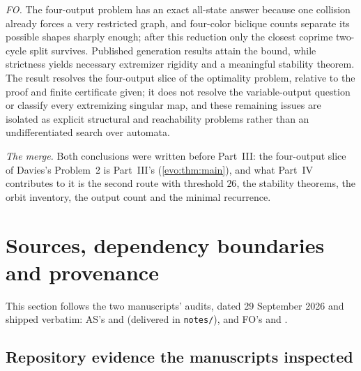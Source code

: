 \documentclass[11pt,a4paper]{article}
\numberwithin{equation}{section}
\theoremstyle{definition}
\theoremstyle{remark}
\begin{document}
\emph{FO.} The four-output problem has an exact all-state answer because one
collision already forces a very restricted graph, and four-color biclique
counts separate its possible shapes sharply enough; after this reduction only
the closest coprime two-cycle split survives. Published generation results
attain the bound, while strictness yields necessary extremizer rigidity and a
meaningful stability theorem. The result resolves the four-output slice of the
optimality problem, relative to the proof and finite certificate given; it does
not resolve the variable-output question or classify every extremizing
singular map, and these remaining issues are isolated as explicit structural
and reachability problems rather than an undifferentiated search over automata.

\emph{The merge.} Both conclusions were written before Part~III: the
four-output slice of Davies's Problem~2 is Part~III's (\cref{evo:thm:main}), and
what Part~IV contributes to it is the second route with threshold $26$, the
stability theorems, the orbit inventory, the output count and the minimal
recurrence.

\section{Sources, dependency boundaries and provenance}\label{fo:sec:audit}

This section follows the two manuscripts' audits, dated 29 September 2026 and
shipped verbatim: AS's  and
 (delivered in \texttt{notes/}), and FO's
 and .

\subsection{Repository evidence the manuscripts inspected}
\end{document}
